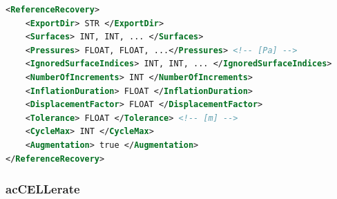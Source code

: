\begin{lstlisting}[language=XML,caption=.xml settings for the ReferenceRecovery plugin]
<ReferenceRecovery>
    <ExportDir> STR </ExportDir>
    <Surfaces> INT, INT, ... </Surfaces>
    <Pressures> FLOAT, FLOAT, ...</Pressures> <!-- [Pa] -->
    <IgnoredSurfaceIndices> INT, INT, ... </IgnoredSurfaceIndices>
    <NumberOfIncrements> INT </NumberOfIncrements>
    <InflationDuration> FLOAT </InflationDuration>
    <DisplacementFactor> FLOAT </DisplacementFactor>
    <Tolerance> FLOAT </Tolerance> <!-- [m] -->
    <CycleMax> INT </CycleMax>
    <Augmentation> true </Augmentation>
</ReferenceRecovery>
\end{lstlisting}

\subsubsection{acCELLerate}
\label{plugin:acCELLerate}

